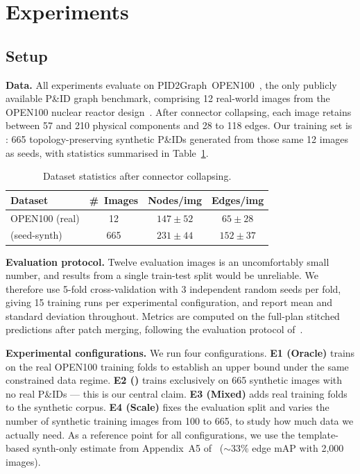 \section{Experiments}
\label{sec:experiments}

\subsection{Setup}
\label{sec:exp:setup}

\noindent\textbf{Data.}
All experiments evaluate on PID2Graph~OPEN100~\cite{sturmer2025},
the only publicly available P\&ID graph benchmark, comprising 12
real-world images from the OPEN100 nuclear reactor
design~\cite{open100}.
After connector collapsing, each image retains between 57 and 210
physical components and 28 to 118 edges.
Our training set is \ours{}: 665 topology-preserving synthetic P\&IDs
generated from those same 12 images as seeds, with statistics
summarised in Table~\ref{tab:dataset_stats}.

\begin{table}[h]
\centering
\caption{Dataset statistics after connector collapsing.}
\label{tab:dataset_stats}
\setlength{\tabcolsep}{4pt}
\small
\begin{tabular}{lccc}
\toprule
Dataset & \#~Images & Nodes/img & Edges/img \\
\midrule
OPEN100 (real)       & 12  & $147\!\pm\!52$ & $65\!\pm\!28$  \\
\ours{} (seed-synth) & 665 & $231\!\pm\!44$ & $152\!\pm\!37$ \\
\bottomrule
\end{tabular}
\end{table}

\noindent\textbf{Evaluation protocol.}
Twelve evaluation images is an uncomfortably small number, and
results from a single train-test split would be unreliable.
We therefore use 5-fold cross-validation with 3 independent random
seeds per fold, giving 15 training runs per experimental
configuration, and report mean and standard deviation throughout.
Metrics are computed on the full-plan stitched predictions after
patch merging, following the evaluation protocol
of~\cite{sturmer2025}.

\noindent\textbf{Experimental configurations.}
We run four configurations. \textbf{E1 (Oracle)} trains on the real
OPEN100 training folds to establish an upper bound under the same
constrained data regime. \textbf{E2 (\ours{})} trains exclusively on
665 synthetic images with no real P\&IDs --- this is our central claim.
\textbf{E3 (Mixed)} adds real training folds to the synthetic corpus.
\textbf{E4 (Scale)} fixes the evaluation split and varies the number
of synthetic training images from 100 to 665, to study how much
data we actually need.
As a reference point for all configurations, we use the
template-based synth-only estimate from Appendix~A5
of~\cite{sturmer2025} (${\sim}33\%$ edge mAP with 2,000 images).

